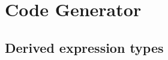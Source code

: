 \chapter{Code Generator}
\label{code-generator}

\section{Derived expression types}
\label{derivedsection}
